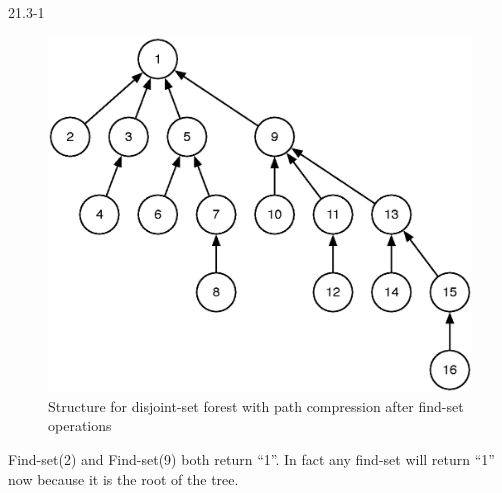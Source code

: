 \begin{problem}{21.3-1}
\begin{solution}
\begin{figure}[H]
    \end{figure}
    \begin{figure}[H]
      \centering
      \caption{Structure for disjoint-set forest with path compression after find-set operations}
      \includegraphics[scale=.5]{21_3_1_4.eps}
    \end{figure}
    Find-set(2) and Find-set(9) both return ``1''. In fact any find-set will return ``1'' now because it is the root of
    the tree.
  \end{solution}
\end{problem}

